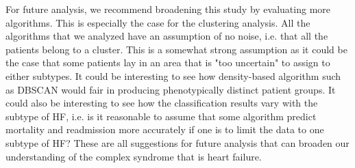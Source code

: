 \documentclass[../thesis.tex]{subfiles}
\begin{document}
\indent For future analysis, we recommend broadening this study by evaluating more algorithms. This is especially the case for the clustering analysis. All the algorithms that we analyzed have an assumption of no noise, i.e. that all the patients belong to a cluster. This is a somewhat strong assumption as it could be the case that some patients lay in an area that is "too uncertain" to assign to either subtypes. It could be interesting to see how density-based algorithm such as DBSCAN \citep{ester1996density} would fair in producing phenotypically distinct patient groups. It could also be interesting to see how the classification results vary with the subtype of HF, i.e. is it reasonable to assume that some algorithm predict mortality and readmission more accurately if one is to limit the data to one subtype of HF? These are all suggestions for future analysis that can broaden our understanding of the complex syndrome that is heart failure. 
\end{document}
